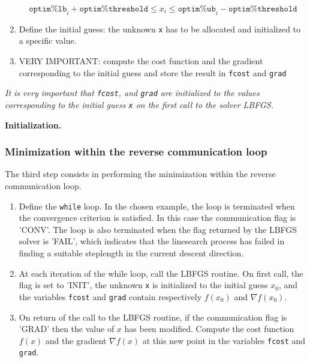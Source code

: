 \documentclass[a4paper,twoside,final,onecolumn,11pt,openright]{article}
\begin{document}
\begin{enumerate}
\begin{equation}
 \texttt{optim\%lb}_i + \texttt{optim\%threshold} \leq x_i \leq \texttt{optim\%ub}_i - \texttt{optim\%threshold}
\end{equation}
\item Define the initial guess: the unknown \texttt{x} has to be allocated and initialized to a specific value. 
\item VERY IMPORTANT: compute the cost function and the gradient corresponding to the initial guess and store the result in \texttt{fcost} and \texttt{grad} 
\end{enumerate}
\textit{It is very important that \texttt{fcost}, and \texttt{grad} are initialized to the values corresponding to the initial guess \texttt{x} on the first call to the solver LBFGS.}

\framebox{
\small
 
}
\normalsize
\begin{center}
\textbf{Initialization.} 
\end{center}

\subsubsection{Minimization within the reverse communication loop}

The third step consists in performing the minimization within the reverse communication loop. 
\begin{enumerate}
 \item Define the \texttt{while} loop. In the chosen example, the loop is terminated when the convergence criterion is satisfied. In this case the communication flag is 'CONV'. The loop is also terminated when the flag returned by the LBFGS solver is 'FAIL', which indicates that the linesearch process has failed in finding a suitable steplength in the current descent direction. 
 \item At each iteration of the while loop, call the LBFGS  routine. On first call, the flag is set to 'INIT', the unknown \texttt{x} is initialized to the initial guess $x_0$, and the variables \texttt{fcost} and \texttt{grad} contain respectively $f(x_0)$ and $\nabla f(x_0)$.
\item On return of the call to the LBFGS routine, if the communication flag is 'GRAD' then the value of $x$ has been modified. Compute the cost function $f(x)$ and the gradient $\nabla f(x)$ at this new point in the variables \texttt{fcost} and \texttt{grad}.
\end{enumerate}
\end{document}
